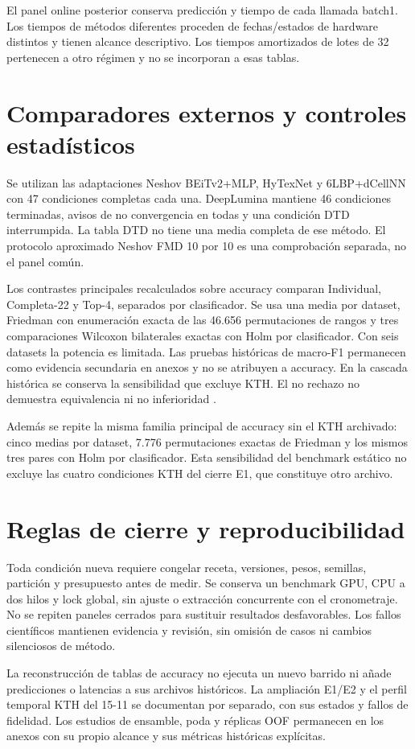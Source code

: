 El panel online posterior conserva predicción y tiempo de cada llamada batch1. Los tiempos de métodos diferentes proceden de fechas/estados de hardware distintos y tienen alcance descriptivo. Los tiempos amortizados de lotes de 32 pertenecen a otro régimen y no se incorporan a esas tablas.

\section{Comparadores externos y controles estadísticos}
Se utilizan las adaptaciones Neshov BEiTv2+MLP, HyTexNet y 6LBP+dCellNN con 47 condiciones completas cada una. DeepLumina mantiene 46 condiciones terminadas, avisos de no convergencia en todas y una condición DTD interrumpida. La tabla DTD no tiene una media completa de ese método. El protocolo aproximado Neshov FMD 10 por 10 es una comprobación separada, no el panel común.

Los contrastes principales recalculados sobre accuracy comparan Individual, Completa-22 y Top-4, separados por clasificador. Se usa una media por dataset, Friedman con enumeración exacta de las 46.656 permutaciones de rangos y tres comparaciones Wilcoxon bilaterales exactas con Holm por clasificador. Con seis datasets la potencia es limitada. Las pruebas históricas de macro-F1 permanecen como evidencia secundaria en anexos y no se atribuyen a accuracy. En la cascada histórica se conserva la sensibilidad que excluye KTH. El no rechazo no demuestra equivalencia ni no inferioridad \citep{demsar2006statistical,garcia2008extension}.

Además se repite la misma familia principal de accuracy sin el KTH archivado: cinco medias por dataset, 7.776 permutaciones exactas de Friedman y los mismos tres pares con Holm por clasificador. Esta sensibilidad del benchmark estático no excluye las cuatro condiciones KTH del cierre E1, que constituye otro archivo.

\section{Reglas de cierre y reproducibilidad}
Toda condición nueva requiere congelar receta, versiones, pesos, semillas, partición y presupuesto antes de medir. Se conserva un benchmark GPU, CPU a dos hilos y lock global, sin ajuste o extracción concurrente con el cronometraje. No se repiten paneles cerrados para sustituir resultados desfavorables. Los fallos científicos mantienen evidencia y revisión, sin omisión de casos ni cambios silenciosos de método.

La reconstrucción de tablas de accuracy no ejecuta un nuevo barrido ni añade predicciones o latencias a sus archivos históricos. La ampliación E1/E2 y el perfil temporal KTH del 15-11 se documentan por separado, con sus estados y fallos de fidelidad. Los estudios de ensamble, poda y réplicas OOF permanecen en los anexos con su propio alcance y sus métricas históricas explícitas.
